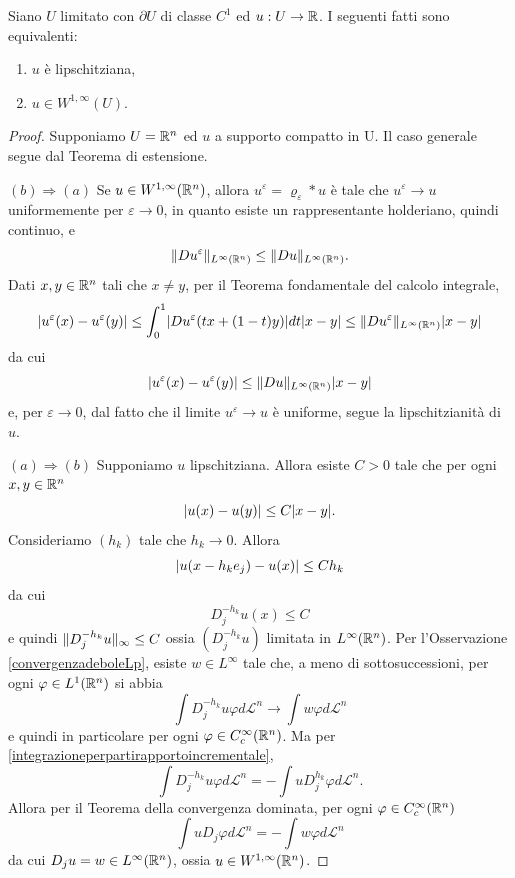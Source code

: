 \begin{proposizione}
	Siano $U$ limitato con $\partial U$ di classe $C^1$ ed $u : U \to \R$. I seguenti fatti sono equivalenti:
	\begin{enumerate}[$(a)$]
		\item $u$ è lipschitziana,
		\item $u \in W^{1,\infty}(U)$.
	\end{enumerate}
	
	\begin{proof} Supponiamo $U = \R^n$ ed $u$ a supporto compatto in U. Il caso generale segue dal Teorema di estensione.
		\par\noindent
		$(b) \Longrightarrow (a)$ Se $u \in W^{1,\infty}(\R^n)$, allora $u^\varepsilon = \varrho_\varepsilon \ast u$ è tale che $u^\varepsilon \to u$ uniformemente per $\varepsilon \to 0$, in quanto esiste un rappresentante holderiano, quindi continuo, e 
		\[ \norm{Du^\varepsilon}_{L^\infty(\R^n)} \le \norm{Du}_{L^\infty(\R^n)}. \]
		Dati $x,y \in \R^n$ tali che $x \ne y$, per il Teorema fondamentale del calcolo integrale,
		\[\abs*{u^\varepsilon(x) - u^\varepsilon(y)} \le \int_{0}^{1} \abs*{Du^\varepsilon(tx + (1-t)y)}dt \abs{x-y} \le \norm{Du^\varepsilon}_{L^\infty(\R^n)} \abs{x-y} \]
		da cui 
		\[ \abs*{u^\varepsilon(x) - u^\varepsilon(y)} \le \norm{Du}_{L^\infty(\R^n)}\abs{x-y} \]
		e, per $\varepsilon \to 0$, dal fatto che il limite $u^\varepsilon \to u$ è uniforme, segue la lipschitzianità di $u$.
		\par\noindent
		$(a) \Longrightarrow (b)$ Supponiamo $u$ lipschitziana. Allora esiste $C>0$ tale che per ogni $x,y \in \R^n$
		\[ \abs{u(x) -u(y)}\le C\abs{x-y}. \]
		Consideriamo $(h_k)$ tale che $h_k \to 0$. Allora
		\[ \abs{u(x-h_ke_j) -u(x)}\le Ch_k \]
		da cui 
		\[ D^{-h_k}_ju(x) \le C \]
		e quindi $\norm{ D^{-h_k}_ju}_\infty \le C$ ossia $(D^{-h_k}_ju)$ limitata in $L^\infty(\R^n)$. Per l'Osservazione \eqref{convergenzadeboleLp}, esiste $w \in L^\infty$ tale che, a meno di sottosuccessioni, per ogni $\varphi \in L^1(\R^n)$ si abbia
		\[ \int D^{-h_k}_j u \varphi d\mathcal{L}^n \to \int w \varphi d\mathcal{L}^n \]
		e quindi in particolare per ogni $\varphi \in C^\infty_c(\R^n)$. Ma per \eqref{integrazioneperpartirapportoincrementale}, 
		\[ \int D_j^{-h_k}u\varphi d\mathcal{L}^n = -\int u D^{h_k}_j\varphi d\mathcal{L}^n. \]
		Allora per il Teorema della convergenza dominata, per ogni $\varphi \in C^\infty_c(\R^n)$
		\[ \int uD_j\varphi d\mathcal{L}^n = -\int w \varphi d\mathcal{L}^n \]
		da cui $D_j u = w \in L^\infty(\R^n)$, ossia $u \in W^{1,\infty}(\R^n)$.
	\end{proof}
\end{proposizione}
